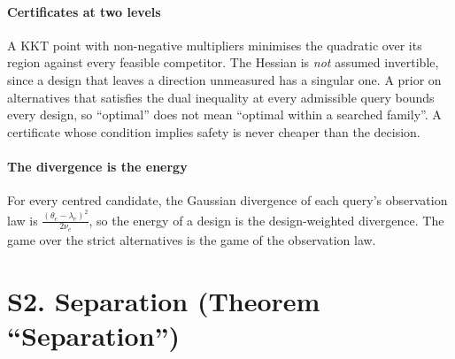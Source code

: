 
\paragraph{Certificates at two levels} A KKT point with non-negative multipliers minimises the
quadratic over its region against every feasible competitor. The Hessian is \emph{not} assumed
invertible, since a design that leaves a direction unmeasured has a singular one. A prior on
alternatives that satisfies the dual inequality at every admissible query bounds every design,
so ``optimal'' does not mean ``optimal within a searched family''. A certificate whose
condition implies safety is never cheaper than the decision.


\paragraph{The divergence is the energy} For every centred candidate, the Gaussian divergence
of each query's observation law is $\frac{(\theta_{e}-\lambda_{e})^{2}}{2\nu_{e}}$, so the
energy of a design is the design-weighted divergence. The game over the strict alternatives is
the game of the observation law.


\section{S2. Separation (Theorem ``Separation'')}

